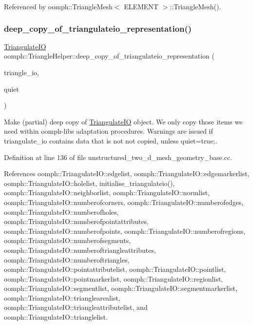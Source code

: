 Referenced by oomph\+::\+Triangle\+Mesh$<$ E\+L\+E\+M\+E\+N\+T $>$\+::\+Triangle\+Mesh().

\mbox{\label{namespaceoomph_1_1TriangleHelper_aebd618de1bc6e9f00c05e6bdd0169d8a}} 
\subsubsection{\texorpdfstring{deep\+\_\+copy\+\_\+of\+\_\+triangulateio\+\_\+representation()}{deep\_copy\_of\_triangulateio\_representation()}}
{\footnotesize\ttfamily \hyperlink{structoomph_1_1TriangulateIO}{Triangulate\+IO} oomph\+::\+Triangle\+Helper\+::deep\+\_\+copy\+\_\+of\+\_\+triangulateio\+\_\+representation (\begin{DoxyParamCaption}\item[{\hyperlink{structoomph_1_1TriangulateIO}{Triangulate\+IO} \&}]{triangle\+\_\+io,  }\item[{const bool \&}]{quiet }\end{DoxyParamCaption})}



Make (partial) deep copy of \hyperlink{structoomph_1_1TriangulateIO}{Triangulate\+IO} object. We only copy those items we need within oomph-\/lib\textquotesingle{}s adaptation procedures. Warnings are issued if triangulate\+\_\+io contains data that is not not copied, unless quiet=true;. 



Definition at line 136 of file unstructured\+\_\+two\+\_\+d\+\_\+mesh\+\_\+geometry\+\_\+base.\+cc.



References oomph\+::\+Triangulate\+I\+O\+::edgelist, oomph\+::\+Triangulate\+I\+O\+::edgemarkerlist, oomph\+::\+Triangulate\+I\+O\+::holelist, initialise\+\_\+triangulateio(), oomph\+::\+Triangulate\+I\+O\+::neighborlist, oomph\+::\+Triangulate\+I\+O\+::normlist, oomph\+::\+Triangulate\+I\+O\+::numberofcorners, oomph\+::\+Triangulate\+I\+O\+::numberofedges, oomph\+::\+Triangulate\+I\+O\+::numberofholes, oomph\+::\+Triangulate\+I\+O\+::numberofpointattributes, oomph\+::\+Triangulate\+I\+O\+::numberofpoints, oomph\+::\+Triangulate\+I\+O\+::numberofregions, oomph\+::\+Triangulate\+I\+O\+::numberofsegments, oomph\+::\+Triangulate\+I\+O\+::numberoftriangleattributes, oomph\+::\+Triangulate\+I\+O\+::numberoftriangles, oomph\+::\+Triangulate\+I\+O\+::pointattributelist, oomph\+::\+Triangulate\+I\+O\+::pointlist, oomph\+::\+Triangulate\+I\+O\+::pointmarkerlist, oomph\+::\+Triangulate\+I\+O\+::regionlist, oomph\+::\+Triangulate\+I\+O\+::segmentlist, oomph\+::\+Triangulate\+I\+O\+::segmentmarkerlist, oomph\+::\+Triangulate\+I\+O\+::trianglearealist, oomph\+::\+Triangulate\+I\+O\+::triangleattributelist, and oomph\+::\+Triangulate\+I\+O\+::trianglelist.



